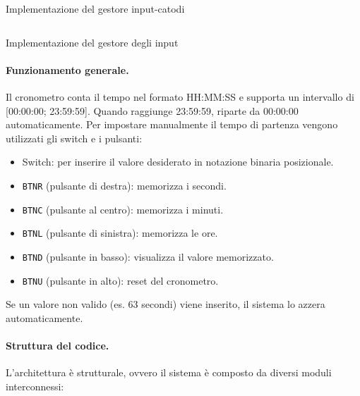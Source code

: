 \begin{code}
    \inputminted{vhdl}{vhdl/chronometer_cathodes_input_manager.vhd}
    \caption{Implementazione del gestore input-catodi}
    \label{cod:chronometer_cathodes_input_manager}
\end{code}

\begin{code}
    \inputminted{vhdl}{vhdl/chronometer_input_manager.vhd}
    \caption{Implementazione del gestore degli input}
    \label{cod:chronometer_input_manager}
\end{code}

\paragraph{Funzionamento generale.}
Il cronometro conta il tempo nel formato HH:MM:SS e supporta un intervallo di [00:00:00; 23:59:59]. Quando raggiunge 23:59:59, riparte da 00:00:00 automaticamente. Per impostare manualmente il tempo di partenza vengono utilizzati gli switch e i pulsanti:

\begin{itemize}
    \item Switch: per inserire il valore desiderato in notazione binaria posizionale.
    \item \texttt{BTNR} (pulsante di destra): memorizza i secondi.
    \item \texttt{BTNC} (pulsante al centro): memorizza i minuti.
    \item \texttt{BTNL} (pulsante di sinistra): memorizza le ore.
    \item \texttt{BTND} (pulsante in basso): visualizza il valore memorizzato.
    \item \texttt{BTNU} (pulsante in alto): reset del cronometro.
\end{itemize}

Se un valore non valido (es. 63 secondi) viene inserito, il sistema lo azzera automaticamente.

\paragraph{Struttura del codice.}
L'architettura è strutturale, ovvero il sistema è composto da diversi moduli interconnessi:

